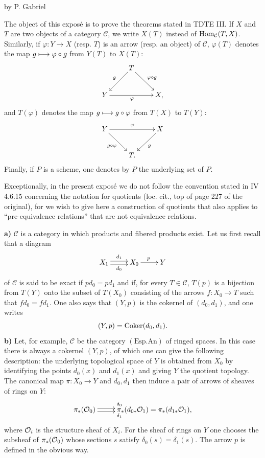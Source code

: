 \label{V}
\begin{center}by P. Gabriel\end{center}

The object of this exposé is to prove the theorems stated in TDTE III. If $X$ and $T$ are two objects of a category $\mathcal C$, we write $X(T)$ instead of $\operatorname{Hom}_{\mathcal C}(T,X)$. Similarly, if $\varphi:Y\to X$ (resp. $T$) is an arrow (resp. an object) of $\mathcal C$, $\varphi(T)$ denotes the map $g\longmapsto\varphi\circ g$ from $Y(T)$ to $X(T)$:
\[
\xymatrix{&T\ar[dl]_g\ar[dr]^{\varphi\circ g}&\\Y\ar[rr]_\varphi&&X,}
\]
and $T(\varphi)$ denotes the map $g\longmapsto g\circ\varphi$ from $T(X)$ to $T(Y)$:
\[
\xymatrix{Y\ar[rr]^\varphi\ar[dr]_{g\circ\varphi}&&X\ar[dl]^g\\&T.&}
\]
Finally, if $P$ is a scheme, one denotes by $\underline P$ the underlying set of $P$.

Exceptionally, in the present exposé we do not follow the convention stated in IV 4.6.15 concerning the notation for quotients (loc. cit., top of page 227 of the original), for we wish to give here a construction of quotients that also applies to ``pre-equivalence relations'' that are not equivalence relations.

\textbf{a)} $\mathcal C$ is a category in which products and fibered products exist. Let us first recall that a diagram
\[
\xymatrix{X_1\ar@<.5ex>[r]^{d_1}\ar@<-.5ex>[r]_{d_0}&X_0\ar[r]^p&Y}
\]
of $\mathcal C$ is said to be exact if $pd_0=pd_1$ and if, for every $T\in\mathcal C$, $T(p)$ is a bijection from $T(Y)$ onto the subset of $T(X_0)$ consisting of the arrows $f:X_0\to T$ such that $fd_0=fd_1$. One also says that $(Y,p)$ is the cokernel of $(d_0,d_1)$, and one writes
\[
(Y,p)=\operatorname{Coker}(d_0,d_1).
\]
\textbf{b)} Let, for example, $\mathcal C$ be the category $(\mathrm{Esp.An})$ of ringed spaces. In this case there is always a cokernel $(Y,p)$, of which one can give the following description: the underlying topological space of $Y$ is obtained from $X_0$ by identifying the points $d_0(x)$ and $d_1(x)$ and giving $Y$ the quotient topology. The canonical map $\pi:X_0\to Y$ and $d_0,d_1$ then induce a pair of arrows of sheaves of rings on $Y$:
\[
\xymatrix{\pi_*(\OO_0)\ar@<.5ex>[r]^{\delta_0}\ar@<-.5ex>[r]_{\delta_1}&\pi_*(d_{0*}\OO_1)=\pi_*(d_{1*}\OO_1),}
\]
where $\mathcal{O}_i$ is the structure sheaf of $X_i$. For the sheaf of rings on $Y$ one chooses the subsheaf of $\pi_*(\mathcal{O}_0)$ whose sections $s$ satisfy $\delta_0(s)=\delta_1(s)$. The arrow $p$ is defined in the obvious way.

